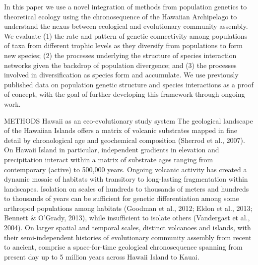 \documentclass[12pt]{article}
\begin{document}
\begin{linenumbers}
	In this paper we use a novel integration of methods from population genetics to theoretical ecology using the chronosequence of the Hawaiian Archipelago to understand the nexus between ecological and evolutionary community assembly. We evaluate (1) the rate and pattern of genetic connectivity among populations of taxa from different trophic levels as they diversify from populations to form new species; (2) the processes  underlying the structure of species interaction networks given the backdrop of population divergence; and (3) the processes involved in diversification as species form and accumulate. We use previously published data on population genetic structure and species interactions as a proof of concept, with the goal of further developing this framework through ongoing work. 

METHODS
Hawaii as an eco-evolutionary study system
The geological landscape of the Hawaiian Islands offers a matrix of volcanic substrates mapped in fine detail by chronological age and geochemical composition (Sherrod et al., 2007). On Hawaii Island in particular, independent gradients in elevation and precipitation interact within a matrix of substrate ages ranging from contemporary (active) to 500,000 years. Ongoing volcanic activity has created a dynamic mosaic of habitats with transitory to long-lasting fragmentation within landscapes. Isolation on scales of hundreds to thousands of meters and hundreds to thousands of years can be sufficient for genetic differentiation among some arthropod populations among habitats (Goodman et al., 2012; Eldon et al., 2013; Bennett & O’Grady, 2013), while insufficient to isolate others (Vandergast et al., 2004). On larger spatial and temporal scales, distinct volcanoes and islands, with their semi-independent histories of evolutionary community assembly from recent to ancient, comprise a space-for-time geological chronosequence spanning from present day up to 5 million years across Hawaii Island to Kauai.


\end{linenumbers}
\end{document}
